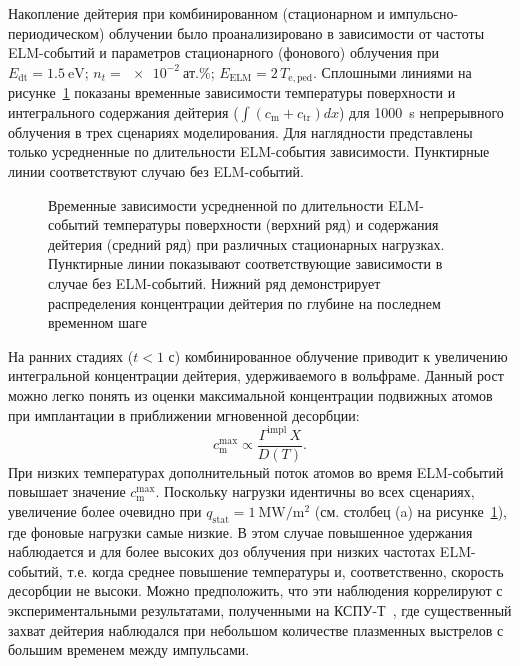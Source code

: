 Накопление дейтерия при комбинированном (стационарном и импульсно-периодическом) облучении было проанализировано в зависимости от частоты ELM-событий и параметров стационарного (фонового) облучения при $E_{\mathrm{dt}}=\SI{1.5}{\electronvolt}$; $n_{t}=\SI{e-2}{\text{ат.}\percent}$; $E_{\mathrm{ELM}}=2\, T_{\mathrm{e,ped}}$. Сплошными линиями на рисунке~\cref{fig:ch3/ELMs_frequency} показаны временные зависимости температуры поверхности и интегрального содержания дейтерия ($\int \left(c_{\mathrm{m}}+c_{\mathrm{tr}}\right)dx$) для \SI{1000}{\second} непрерывного облучения в трех сценариях моделирования. Для наглядности представлены только усредненные по длительности ELM-события зависимости. Пунктирные линии соответствуют случаю без ELM-событий.
\begin{figure}[ht]
	\caption{Временные зависимости усредненной по длительности ELM-событий температуры поверхности (верхний ряд) и содержания дейтерия (средний ряд) при различных стационарных нагрузках. Пунктирные линии показывают соответствующие зависимости в случае без ELM-событий. Нижний ряд демонстрирует распределения концентрации дейтерия по глубине на последнем временном шаге}\label{fig:ch3/ELMs_frequency}
\end{figure}
На ранних стадиях ($t<1$ с) комбинированное облучение приводит к увеличению интегральной концентрации дейтерия, удерживаемого в вольфраме. Данный рост можно легко понять из оценки максимальной концентрации подвижных атомов при имплантации в приближении мгновенной десорбции:
\begin{equation}
	\label{eq:ch3/max_c}
	c_{\mathrm{m}}^{\max}\propto \frac{\Gamma^{\mathrm{impl}} \, X}{D(T)}.
\end{equation}
При низких температурах дополнительный поток атомов во время ELM-событий повышает значение $c_{\mathrm{m}}^{\max}$. Поскольку нагрузки идентичны во всех сценариях, увеличение более очевидно при $q_{\mathrm{stat}}=\SI{1}{\mega\watt\per\meter\squared}$ (см. столбец (a) на рисунке~\cref{fig:ch3/ELMs_frequency}), где фоновые нагрузки самые низкие. В этом случае повышенное удержания наблюдается и для более высоких доз облучения при низких частотах ELM-событий, т.е. когда среднее повышение температуры и, соответственно, скорость десорбции не высоки. Можно предположить, что эти наблюдения коррелируют с экспериментальными результатами, полученными на КСПУ-Т~\cite{Ogorodnikova,Poskakalov2020}, где существенный захват дейтерия наблюдался при небольшом количестве плазменных выстрелов с большим временем между импульсами.

